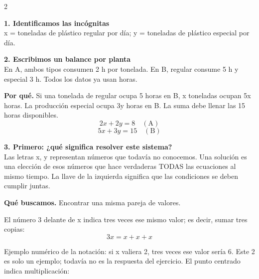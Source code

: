 \documentclass[11pt,a4paper,landscape]{article}
\begin{document}
\begin{multicols*}{2}
\noindent\begin{minipage}{\linewidth}\textbf{1. Identificamos las incógnitas}\\[2pt]x = toneladas de plástico regular por día; y = toneladas de plástico especial por día.
\par{}\par\smallskip
\end{minipage}\par\medskip
\noindent\begin{minipage}{\linewidth}\textbf{2. Escribimos un balance por planta}\\[2pt]En A, ambos tipos consumen 2 h por tonelada. En B, regular consume 5 h y especial 3 h. Todos los datos ya usan horas.
\par\smallskip\textbf{Por qué.} Si una tonelada de regular ocupa 5 horas en B, x toneladas ocupan 5x horas. La producción especial ocupa 3y horas en B. La suma debe llenar las 15 horas disponibles.
\[2x+2y=8\quad(\mathrm{A})\]
\[5x+3y=15\quad(\mathrm{B})\]
\end{minipage}\par\medskip
\noindent\begin{minipage}{\linewidth}\textbf{3. Primero: ¿qué significa resolver este sistema?}\\[2pt]Las letras x, y representan números que todavía no conocemos. Una solución es una elección de esos números que hace verdaderas TODAS las ecuaciones al mismo tiempo. La llave de la izquierda significa que las condiciones se deben cumplir juntas.
\par\smallskip\textbf{Qué buscamos.} Encontrar una misma pareja de valores.
\par\smallskip El número 3 delante de x indica tres veces ese mismo valor; es decir, sumar tres copias:
\[3x=x+x+x\]
\par\smallskip Ejemplo numérico de la notación: si x valiera 2, tres veces ese valor sería 6. Este 2 es solo un ejemplo; todavía no es la respuesta del ejercicio. El punto centrado indica multiplicación:

\end{minipage}
\end{multicols*}
\end{document}
